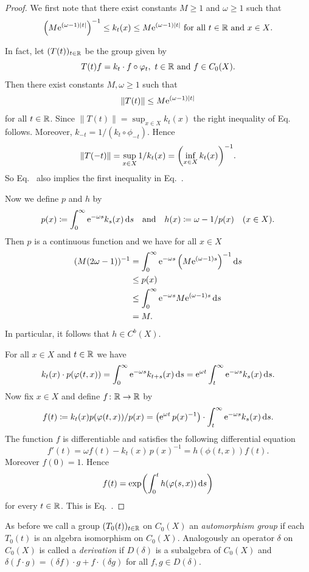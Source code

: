 \begin{proof}
We first note that there exist constants $M \geq 1 $ and $\omega \geq 1$ such that
\begin{equation}\label{eq:b2-3.16}
\mleft( M\eu^{(\omega-1)|t|} \mright)^{-1} \leq k_{t}(x) 
	\leq M\eu^{(\omega-1)|t|} \text{ for all $t \in \R$ and  $x \in X$.}
\end{equation}

In fact, let $(T(t))_{t \in \mathbb{R}}$ be the group given by 
%
\[
	T(t)f = k_{t} \cdot f \circ \phi_{t}, 
	\text{ $ t \in \R$ and $f \in C_{0}(X)$}.
\]
%
Then there exist constants $M, \omega \geq 1$ such that
\begin{equation}\label{eq:b2-3.17}
\|T(t)\| \leq M\eu^{(\omega-1)|t|}
\end{equation}
for all $t \in \mathbb{R}$.
Since $\|T(t)\| = \sup_{x \in X} k_{t}(x)$ the right inequality of
Eq.~ follows.
Moreover, $k_{-t} = 1/(k_{t} \circ \phi_{-t})$.
Hence 
%
\[
	\|T(-t)\| = \sup_{x \in X} 1/k_{t}(x) = \mleft( \inf_{x \in X} k_{t}(x) \mright)^{-1} .
\]
%
So Eq.~ also implies the first inequality in Eq.~.

Now we define $p$ and $h$ by
\[
p(x) \coloneq \int_{0}^{\infty} \mathrm{e}^{-\omega s}k_{s}(x) \mathop{}\!\mathrm{d}{s} 
\quad \text{and} \quad 
h(x) \coloneq \omega - 1/p(x) \quad (x \in X).
\]
Then $p$ is a continuous function and we have for all $x \in X $
\begin{align*}
(M(2\omega - 1))^{-1} &= \int_{0}^{\infty} \eu^{-\omega s}\left(M\eu^{(\omega-1)s}\right)^{-1} \ds \\ 
&\leq p(x) \\ 
&\leq \int_{0}^{\infty} \eu^{-\omega s}M\eu^{(\omega-1)s} \ds \\
&= M .
\end{align*}
In particular, it follows that $h \in C^{b}(X)$.

For all $x \in X$ and $t \in \mathbb{R}$ we have 
\[
k_{t}(x) \cdot p(\phi(t,x)) = \int_{0}^{\infty} \eu^{-\omega s}k_{t+s}(x) \ds 
= \eu^{\omega t} \int_{t}^{\infty} \eu^{-\omega s}k_{s}(x) \ds.
\]
Now fix $x \in X$ and define $f \colon \mathbb{R} \to \mathbb{R}$ by 
\[
f(t) \coloneq k_{t}(x)p(\phi(t,x))/p(x) 
 = \mleft( \eu^{\omega t}\,p(x)^{-1} \mright) \cdot \int_{t}^{\infty} \eu^{-\omega s}k_{s}(x)  \ds.
\]
The function $f$ is differentiable and satisfies the following differential equation 
\[
f'(t) = \omega f(t)  - k_{t}(x)\,p(x)^{-1}  = h(\phi(t,x))f(t).
\]
Moreover $f(0) = 1$.
Hence %
\[
	f(t) = \exp \mleft( \int_{0}^{t} h(\phi(s,x)) \ds \mright)
\]
%
for every $t \in \mathbb{R}$.
This is Eq.~.
\end{proof}
As before we call a group $(T_{0}(t))_{t \in \mathbb{R}}$ on $C_{0}(X)$ an \emph{automorphism group} if each $T_{0}(t)$ is an algebra isomorphism on $C_{0}(X)$.
Analogously an operator $\delta$ on $C_{0}(X)$ is called a \emph{derivation} if\/ $D(\delta)$ is a subalgebra of\/ $C_{0}(X)$ and $\delta(f \cdot g) = (\delta f) \cdot g + f \cdot (\delta g)$ for all $f,g \in D(\delta)$.

